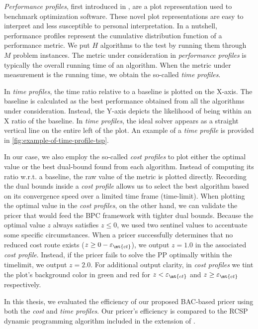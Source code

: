 \textit{Performance profiles}, first introduced in \textcite{dolan2002},
are a plot representation used to benchmark optimization software.
These novel plot representations are easy to interpret and less susceptible to personal interpretation.
In a nutshell, performance profiles represent the cumulative distribution function of a performance metric.
We put $H$ algorithms to the test by running them through $M$ problem instances.
The metric under consideration in \textit{performance profiles}
is typically the overall running time of an algorithm.
When the metric under measurement is the running time, we obtain the so-called \textit{time profiles}.

In \textit{time profiles}, the time ratio relative to a baseline is plotted on the X-axis.
The baseline is calculated as the best performance obtained from all the algorithms under consideration.
Instead, the Y-axis depicts the likelihood of being within an X ratio of the baseline.
In \textit{time profiles}, the ideal solver appears as a straight vertical line on the entire left of the plot.
An example of a \textit{time profile} is provided in \cref{fig:example-of-time-profile-tsp}.

In our case, we also employ the so-called \textit{cost profiles} to plot either the optimal value
or the best dual-bound found from each algorithm.
Instead of computing its ratio w.r.t. a baseline, the raw value of the metric is plotted directly.
Recording the dual bounds inside a \textit{cost profile}
allows us to select the best algorithm
based on its convergence speed over a limited time frame (time-limit).
When plotting the optimal value in the \textit{cost profiles}, on the other hand,
we can validate the pricer that would feed the BPC framework with tighter dual bounds.
Because the optimal value $z$ always satisfies $z \le 0$,
we used two sentinel values to accentuate some specific circumstances.
When a pricer successfully determines that no reduced cost route exists
($z \ge 0 - \varepsilon_{\mt{ct}}$),
we output $z = 1.0$ in the associated \textit{cost profile}.
Instead, if the pricer fails to solve the PP optimally within the timelimit,
we output $z = 2.0$.
For additional output clarity, in \textit{cost profiles} we tint
the plot's background color in green and red for $z < \varepsilon_{\mt{ct}}$ and $z \ge \varepsilon_{\mt{ct}}$ respectively.

\medskip

In this thesis, we evaluated the efficiency of our proposed BAC-based pricer
using both the \textit{cost} and \textit{time profiles}.
Our pricer's efficiency is compared to the RCSP dynamic programming algorithm
included in the \vrpsolver{} extension \parencite{pessoa2020generic} of \bapcod{}.

